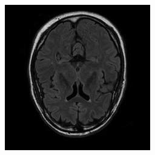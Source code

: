 \documentclass[runningheads,a4paper]{llncs}
\begin{document}
\begin{figure}
\begin{minipage}{.24\textwidth}
  \end{minipage}
  \begin{minipage}{.24\textwidth}
 \includegraphics[width=.99\linewidth]{./images/t2-flair.png}
  \end{minipage}
  

\end{figure}
\end{document}
